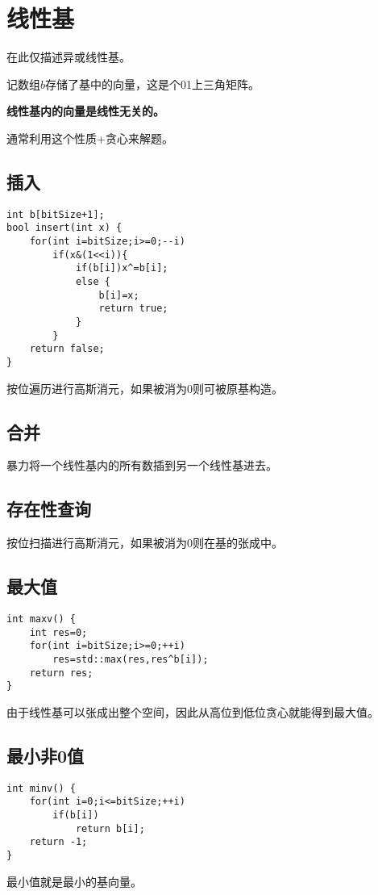 \section{线性基}
在此仅描述异或线性基。

记数组$b$存储了基中的向量，这是个01上三角矩阵。

\begin{property}
    {\bfseries 线性基内的向量是线性无关的。}
\end{property}
通常利用这个性质+贪心来解题。
\subsection{插入}
\begin{lstlisting}
int b[bitSize+1];
bool insert(int x) {
    for(int i=bitSize;i>=0;--i)
        if(x&(1<<i)){
            if(b[i])x^=b[i];
            else {
                b[i]=x;
                return true;
            }
        }
    return false;
}
\end{lstlisting}
按位遍历进行高斯消元，如果被消为0则可被原基构造。
\subsection{合并}
暴力将一个线性基内的所有数插到另一个线性基进去。
\subsection{存在性查询}
按位扫描进行高斯消元，如果被消为0则在基的张成中。
\subsection{最大值}
\begin{lstlisting}
int maxv() {
    int res=0;
    for(int i=bitSize;i>=0;++i)
        res=std::max(res,res^b[i]);
    return res;
}
\end{lstlisting}
由于线性基可以张成出整个空间，因此从高位到低位贪心就能得到最大值。
\subsection{最小非0值}
\begin{lstlisting}
int minv() {
    for(int i=0;i<=bitSize;++i)
        if(b[i])
            return b[i];
    return -1;
}
\end{lstlisting}
最小值就是最小的基向量。
